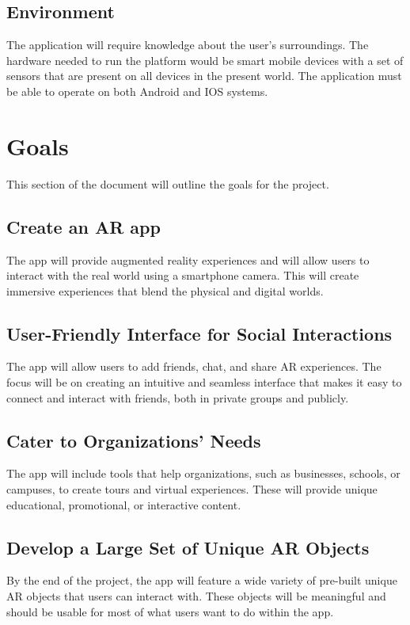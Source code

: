 \documentclass{article}
\begin{document}
\subsection{Environment}

The application will require knowledge about the user's surroundings. The hardware needed to run the platform would be smart mobile devices with a set of sensors that are present on all devices in the present world. The application must be able to operate on both Android and IOS systems. 

\section{Goals}
This section of the document will outline the goals for the project.

\subsection{Create an AR app}
The app will provide augmented reality experiences and will allow users to interact with the real world using a smartphone camera. This will create immersive experiences that blend the physical and digital worlds.

\subsection{User-Friendly Interface for Social Interactions}
The app will allow users to add friends, chat, and share AR experiences. The focus will be on creating an intuitive and seamless interface that makes it easy to connect and interact with friends, both in private groups and publicly.

\subsection{Cater to Organizations’ Needs}
The app will include tools that help organizations, such as businesses, schools, or campuses, to create tours and virtual experiences. These will provide unique educational, promotional, or interactive content.

\subsection{Develop a Large Set of Unique AR Objects}
By the end of the project, the app will feature a wide variety of pre-built unique AR objects that users can interact with. These objects will be meaningful and should be usable for most of what users want to do within the app.
\end{document}
